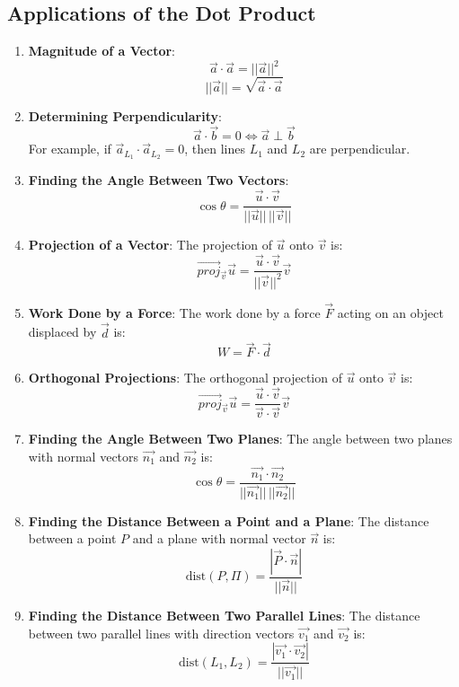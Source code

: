 \subsection{Applications of the Dot Product}
\begin{enumerate}
    \item \textbf{Magnitude of a Vector}:
    \[
        \vec{a} \cdot \vec{a} = ||\vec{a}||^2
    \]
    \[
        ||\vec{a}|| = \sqrt{\vec{a} \cdot \vec{a}}
    \]

    \item \textbf{Determining Perpendicularity}:
    \[
        \vec{a} \cdot \vec{b} = 0 \iff \vec{a} \perp \vec{b}
    \]
    For example, if \(\vec{a}_{L_1} \cdot \vec{a}_{L_2} = 0\), then lines \(L_1\) and \(L_2\) are perpendicular.

    \item \textbf{Finding the Angle Between Two Vectors}:
    \[
        \cos{\theta} = \dfrac{\vec{u} \cdot \vec{v}}{||\vec{u}|| \, ||\vec{v}||}
    \]

    \item \textbf{Projection of a Vector}:
    The projection of \(\vec{u}\) onto \(\vec{v}\) is:
    \[
        \vec{proj}_{\vec{v}} \vec{u} = \dfrac{\vec{u} \cdot \vec{v}}{||\vec{v}||^2} \vec{v}
    \]

    \item \textbf{Work Done by a Force}:
    The work done by a force \(\vec{F}\) acting on an object displaced by \(\vec{d}\) is:
    \[
        W = \vec{F} \cdot \vec{d}
    \]

    \item \textbf{Orthogonal Projections}:
    The orthogonal projection of \(\vec{u}\) onto \(\vec{v}\) is:
    \[
        \vec{proj}_{\vec{v}} \vec{u} = \dfrac{\vec{u} \cdot \vec{v}}{\vec{v} \cdot \vec{v}} \vec{v}
    \]

    \item \textbf{Finding the Angle Between Two Planes}:
    The angle between two planes with normal vectors \(\vec{n_1}\) and \(\vec{n_2}\) is:
    \[
        \cos{\theta} = \dfrac{\vec{n_1} \cdot \vec{n_2}}{||\vec{n_1}|| \, ||\vec{n_2}||}
    \]

    \item \textbf{Finding the Distance Between a Point and a Plane}:
    The distance between a point \(P\) and a plane with normal vector \(\vec{n}\) is:
    \[
        \text{dist}(P, \Pi) = \dfrac{|\vec{P} \cdot \vec{n}|}{||\vec{n}||}
    \]

    \item \textbf{Finding the Distance Between Two Parallel Lines}:
    The distance between two parallel lines with direction vectors \(\vec{v_1}\) and \(\vec{v_2}\) is:
    \[
        \text{dist}(L_1, L_2) = \dfrac{|\vec{v_1} \cdot \vec{v_2}|}{||\vec{v_1}||}
    \]

    
\end{enumerate}

